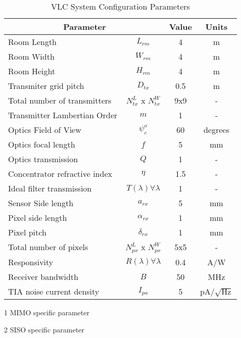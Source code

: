 \begin{table}[!b] %
\begin{threeparttable}[b]
\caption{VLC System Configuration Parameters}
\label{tblSystem}
\centering
	\begin{tabular}{|l|c|c|c|}
		\hline
		\multicolumn{2}{|c|}{\bf{Parameter}} & \bf{Value} & \bf{Units}\\
		\hline
		Room Length & $L_{rm}$ & 4 & m\\
		\hline
		Room Width & $W_{rm}$ & 4 & m\\
		\hline
		Room Height & $H_{rm}$ & 4 & m\\
		\hline
		Transmiter grid pitch\tnote{1} & $D_{tx}$ & 0.5 & m\\
		\hline
		Total number of transmitters\tnote{1} & $N_{tx}^{L}$ x $N_{tx}^{W}$ & 9x9 & -\\
		\hline
		Transmitter Lambertian Order & $m$ & 1 & -\\
		\hline
		Optics Field of View & $\psi_{c}^{o}$ & 60 & degrees\\
		\hline
		Optics focal length\tnote{1} & $f$ & 5 & mm\\
		\hline
	  Optics transmission\tnote{1} & $Q$ & 1 & -\\
		\hline
		Concentrator refractive index\tnote{2} & $\eta$ & 1.5 & -\\
		\hline
		Ideal filter transmission & $T(\lambda)\forall \lambda$ & 1 & -\\
		\hline
		Sensor Side length & $a_{rx}$ & 5 & mm\\
		\hline
		Pixel side length\tnote{1} & $\alpha_{rx}$ & 1 & mm\\
		\hline
		Pixel pitch\tnote{1} & $\delta_{rx}$ & 1 & mm\\
		\hline
		Total number of pixels\tnote{1} & $N_{px}^{L}$ x $N_{px}^{W}$ & 5x5 & -\\
		\hline
		Responsivity & $R(\lambda)\forall \lambda$ & 0.4 & A/W\\
		\hline
		Receiver bandwidth & $B$ & 50 & MHz\\
		\hline
		TIA noise current density & $I_{pa}$ & 5 & pA/$\sqrt{\text{Hz}}$\\
		\hline
	\end{tabular}
	\begin{tablenotes}
	\item [1] MIMO specific parameter
	\item [2] SISO specific parameter
	\end{tablenotes}
	\end{threeparttable}
\end{table}

